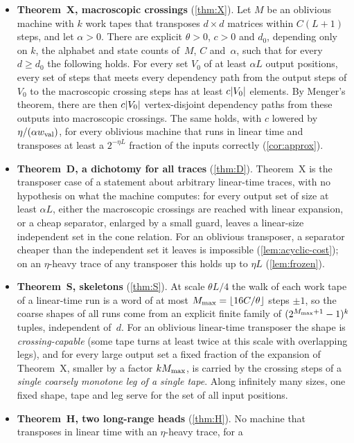 \begin{itemize}[leftmargin=1.5em]
\item \textbf{Theorem~X, macroscopic crossings} (\cref{thm:X}). Let $M$ be an oblivious machine with $k$ work tapes that
transposes $d\times d$ matrices within $C(L+1)$ steps, and let $\alpha>0$. There are explicit $\theta>0$, $c>0$ and $d_0$,
depending only on $k$, the alphabet and state counts of~$M$, $C$ and~$\alpha$, such that for every $d\ge d_0$ the following
holds. For every set $V_0$ of at least $\alpha L$ output positions, every set of steps that meets every dependency path from
the output steps of $V_0$ to the macroscopic crossing steps has at least $c\lvert V_0 \rvert$ elements. By Menger's theorem, there are then
$c\lvert V_0 \rvert$ vertex-disjoint dependency paths from these outputs into macroscopic crossings. The same holds, with $c$ lowered by
$\eta/(\alpha w_{\mathrm{val}})$, for every oblivious machine that runs in linear time and transposes at least a $2^{-\eta L}$ fraction of the
inputs correctly (\cref{cor:approx}).
\item \textbf{Theorem~D, a dichotomy for all traces} (\cref{thm:D}). Theorem~X is the transposer case of a statement about
arbitrary linear-time traces, with no hypothesis on what the machine computes: for every output set of size at least $\alpha L$,
either the macroscopic crossings are reached with linear expansion, or a cheap separator, enlarged by a small guard, leaves a
linear-size independent set in the cone relation. For an oblivious transposer, a separator cheaper than the independent set it leaves is
impossible (\cref{lem:acyclic-cost}); on an $\eta$-heavy trace of any transposer this holds up to $\eta L$ (\cref{lem:frozen}).
\item \textbf{Theorem~S, skeletons} (\cref{thm:S}). At scale $\theta L/4$ the walk of each work tape of a linear-time run is a
word of at most $M_{\max}=\lfloor16C/\theta\rfloor$ steps $\pm1$, so the coarse shapes of all runs come from an explicit finite
family of $(2^{M_{\max}+1}-1)^k$ tuples, independent of~$d$. For an oblivious linear-time transposer the shape is
\emph{crossing-capable} (some tape turns at least twice at this scale with overlapping legs), and for every large output set a
fixed fraction of the expansion of Theorem~X, smaller by a factor $kM_{\max}$, is carried by the crossing steps of a
\emph{single coarsely monotone leg of a single tape}. Along infinitely many
sizes, one fixed shape, tape and leg serve for the set of all input positions.
\item \textbf{Theorem~H, two long-range heads} (\cref{thm:H}). No machine that transposes in linear time with an $\eta$-heavy trace, for a

\end{itemize}
